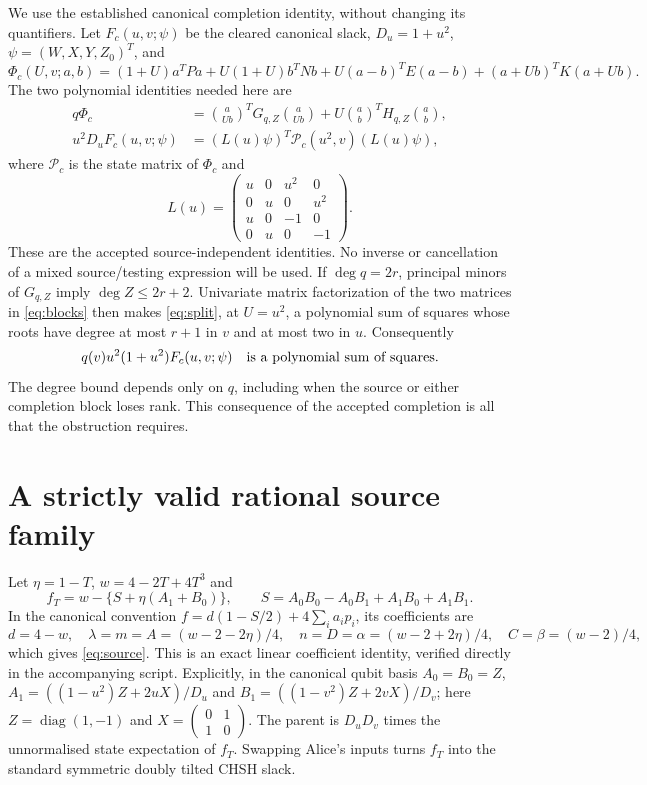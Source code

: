 \documentclass[11pt]{article}
\begin{document}
We use the established canonical completion identity, without changing its
quantifiers. Let $F_c(u,v;\psi)$ be the cleared canonical slack,
$D_u=1+u^2$, $\psi=(W,X,Y,Z_0)^T$, and
\[
\Phi_c(U,v;a,b)=(1+U)a^TPa+U(1+U)b^TNb
+U(a-b)^TE(a-b)+(a+Ub)^TK(a+Ub).
\]
The two polynomial identities needed here are
\begin{align}
q\Phi_c&=\binom a{Ub}^{\!T}G_{q,Z}\binom a{Ub}
+U\binom ab^{\!T}H_{q,Z}\binom ab,\label{eq:split}\\
u^2D_u F_c(u,v;\psi)&=(L(u)\psi)^T\mathcal P_c(u^2,v)(L(u)\psi),\label{eq:inverse}
\end{align}
where $\mathcal P_c$ is the state matrix of $\Phi_c$ and
\[
L(u)=\begin{pmatrix}u&0&u^2&0\\0&u&0&u^2\\u&0&-1&0\\0&u&0&-1\end{pmatrix}.
\]
These are the accepted source-independent identities. No inverse or cancellation
of a mixed source/testing expression will be used.
If $\deg q=2r$, principal minors of $G_{q,Z}$ imply $\deg Z\leq2r+2$.
Univariate matrix factorization of the two matrices in \eqref{eq:blocks}
then makes \eqref{eq:split}, at $U=u^2$, a polynomial sum of squares whose
roots have degree at most $r+1$ in $v$ and at most two in $u$.
Consequently
\begin{equation}\label{eq:necessary}
q(v)u^2(1+u^2)F_c(u,v;\psi)\quad\hbox{is a polynomial sum of squares.}
\end{equation}
The degree bound depends only on $q$, including when the source or either
completion block loses rank. This consequence of the accepted completion is
all that the obstruction requires.

\section{A strictly valid rational source family}
Let $\eta=1-T$, $w=4-2T+4T^3$ and
\[
f_T=w-\{S+\eta(A_1+B_0)\},\qquad
S=A_0B_0-A_0B_1+A_1B_0+A_1B_1.
\]
In the canonical convention $f=d(1-S/2)+4\sum_i a_i p_i$, its coefficients are
\[
d=4-w,\quad \lambda=m=A=(w-2-2\eta)/4,\quad
n=D=\alpha=(w-2+2\eta)/4,\quad C=\beta=(w-2)/4,
\]
which gives \eqref{eq:source}. This is an exact linear coefficient identity,
verified directly in the accompanying script. Explicitly, in the canonical
qubit basis $A_0=B_0=Z$,
$A_1=((1-u^2)Z+2uX)/D_u$ and $B_1=((1-v^2)Z+2vX)/D_v$;
here $Z=\operatorname{diag}(1,-1)$ and
$X=\left(\begin{smallmatrix}0&1\\1&0\end{smallmatrix}\right)$.
The parent is $D_uD_v$ times the unnormalised state expectation of $f_T$.
Swapping Alice's inputs turns
$f_T$ into the standard symmetric doubly tilted CHSH slack.
\end{document}
